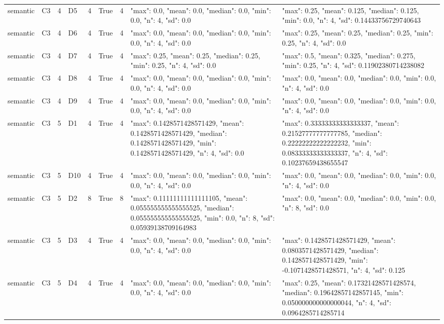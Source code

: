 \begin{tabular}{lllllllll}
semantic & C3 & 4 & D5 & 4 & True & 4 & {"max": 0.0, "mean": 0.0, "median": 0.0, "min": 0.0, "n": 4, "sd": 0.0} & {"max": 0.25, "mean": 0.125, "median": 0.125, "min": 0.0, "n": 4, "sd": 0.14433756729740643} \\
semantic & C3 & 4 & D6 & 4 & True & 4 & {"max": 0.0, "mean": 0.0, "median": 0.0, "min": 0.0, "n": 4, "sd": 0.0} & {"max": 0.25, "mean": 0.25, "median": 0.25, "min": 0.25, "n": 4, "sd": 0.0} \\
semantic & C3 & 4 & D7 & 4 & True & 4 & {"max": 0.25, "mean": 0.25, "median": 0.25, "min": 0.25, "n": 4, "sd": 0.0} & {"max": 0.5, "mean": 0.325, "median": 0.275, "min": 0.25, "n": 4, "sd": 0.11902380714238082} \\
semantic & C3 & 4 & D8 & 4 & True & 4 & {"max": 0.0, "mean": 0.0, "median": 0.0, "min": 0.0, "n": 4, "sd": 0.0} & {"max": 0.0, "mean": 0.0, "median": 0.0, "min": 0.0, "n": 4, "sd": 0.0} \\
semantic & C3 & 4 & D9 & 4 & True & 4 & {"max": 0.0, "mean": 0.0, "median": 0.0, "min": 0.0, "n": 4, "sd": 0.0} & {"max": 0.0, "mean": 0.0, "median": 0.0, "min": 0.0, "n": 4, "sd": 0.0} \\
semantic & C3 & 5 & D1 & 4 & True & 4 & {"max": 0.1428571428571429, "mean": 0.1428571428571429, "median": 0.1428571428571429, "min": 0.1428571428571429, "n": 4, "sd": 0.0} & {"max": 0.33333333333333337, "mean": 0.21527777777777785, "median": 0.22222222222222232, "min": 0.08333333333333337, "n": 4, "sd": 0.10237659438655547} \\
semantic & C3 & 5 & D10 & 4 & True & 4 & {"max": 0.0, "mean": 0.0, "median": 0.0, "min": 0.0, "n": 4, "sd": 0.0} & {"max": 0.0, "mean": 0.0, "median": 0.0, "min": 0.0, "n": 4, "sd": 0.0} \\
semantic & C3 & 5 & D2 & 8 & True & 8 & {"max": 0.11111111111111105, "mean": 0.055555555555555525, "median": 0.055555555555555525, "min": 0.0, "n": 8, "sd": 0.05939138709164983} & {"max": 0.0, "mean": 0.0, "median": 0.0, "min": 0.0, "n": 8, "sd": 0.0} \\
semantic & C3 & 5 & D3 & 4 & True & 4 & {"max": 0.0, "mean": 0.0, "median": 0.0, "min": 0.0, "n": 4, "sd": 0.0} & {"max": 0.1428571428571429, "mean": 0.0803571428571429, "median": 0.1428571428571429, "min": -0.1071428571428571, "n": 4, "sd": 0.125} \\
semantic & C3 & 5 & D4 & 4 & True & 4 & {"max": 0.0, "mean": 0.0, "median": 0.0, "min": 0.0, "n": 4, "sd": 0.0} & {"max": 0.25, "mean": 0.17321428571428574, "median": 0.19642857142857145, "min": 0.050000000000000044, "n": 4, "sd": 0.0964285714285714} \\

\end{tabular}
